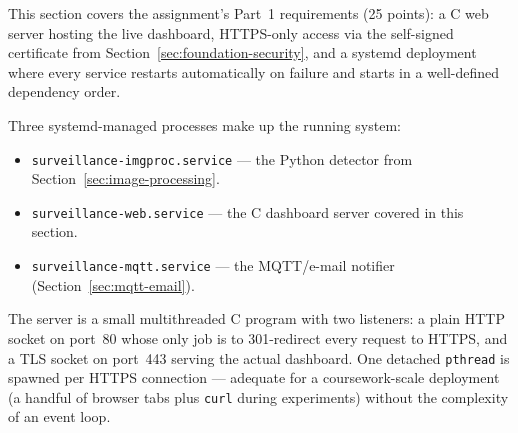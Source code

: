 \label{sec:web-server}


This section covers the assignment's Part~1 requirements (25 points): a
C web server hosting the live dashboard, HTTPS-only access via the
self-signed certificate from Section~\ref{sec:foundation-security}, and a
systemd deployment where every service restarts automatically on failure
and starts in a well-defined dependency order.

Three systemd-managed processes make up the running system:
\begin{itemize}
    \item \texttt{surveillance-imgproc.service} --- the Python detector
    from Section~\ref{sec:image-processing}.
    \item \texttt{surveillance-web.service} --- the C dashboard server
    covered in this section.
    \item \texttt{surveillance-mqtt.service} --- the MQTT/e-mail notifier
    (Section~\ref{sec:mqtt-email}).
\end{itemize}


The server is a small multithreaded C program with two listeners: a plain
HTTP socket on port~80 whose only job is to 301-redirect every request to
HTTPS, and a TLS socket on port~443 serving the actual dashboard. One
detached \texttt{pthread} is spawned per HTTPS connection --- adequate for
a coursework-scale deployment (a handful of browser tabs plus
\texttt{curl} during experiments) without the complexity of an event
loop.

\begin{table}[H]
\centering
\caption{Web server source modules and their responsibilities.}
\label{tab:webserver-modules}
\end{table}

